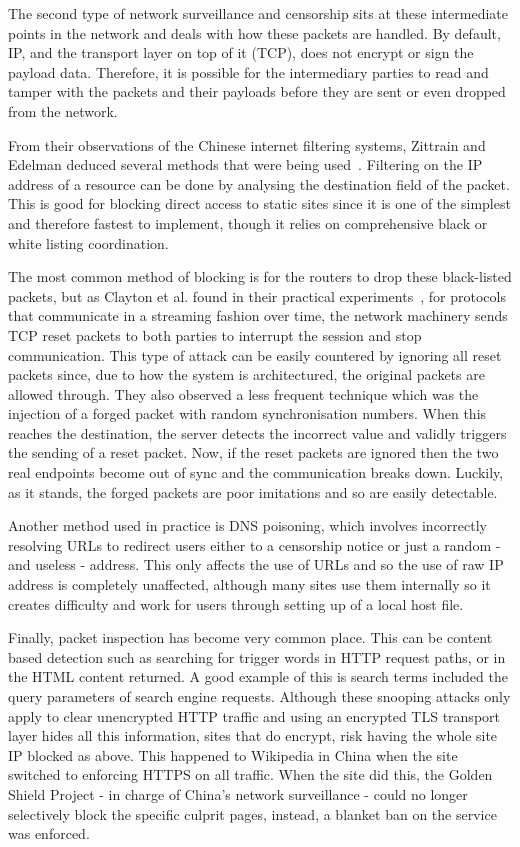 \documentclass[ %
                    author={Samuel Russell},
                supervisor={Prof. Bogdan Warinschi},
                    degree={MEng},
                     title={Innocuous Ciphertexts},
                  subtitle={The DE-CENSOR Scheme},
                      type={research},
                      year={2018} ]{dissertation}
\begin{document}
The second type of network surveillance and censorship sits at these intermediate points in the network and deals with how these packets are handled. By default, IP, and the transport layer on top of it (TCP), does not encrypt or sign the payload data. Therefore, it is possible for the intermediary parties to read and tamper with the packets and their payloads before they are sent or even dropped from the network. 

From their observations of the Chinese internet filtering systems, Zittrain and Edelman deduced several methods that were being used~\cite{edelman2005empirical}.
Filtering on the IP address of a resource can be done by analysing the destination field of the packet. This is good for blocking direct access to static sites since it  is one of the simplest and therefore fastest to implement, though it relies on comprehensive black or white listing coordination.

The most common method of blocking is for the routers to drop these black-listed packets, but as Clayton et al. found in their practical experiments~\cite{clayton2006ignoring}, for protocols that communicate in a streaming fashion over time, the network machinery sends TCP reset packets to both parties to interrupt the session and stop communication. This type of attack can be easily countered by ignoring all reset packets since, due to how the system is architectured, the original packets are allowed through. They also observed a less frequent technique which was the injection of a forged packet with random synchronisation numbers. When this reaches the destination, the server detects the incorrect value and validly triggers the sending of a reset packet. Now, if the reset packets are ignored then the two real endpoints become out of sync and the communication breaks down. Luckily, as it stands, the forged packets are poor imitations and so are easily detectable.

Another method used in practice is DNS poisoning, which involves incorrectly resolving URLs to redirect users either to a censorship notice or just a random - and useless - address. This only affects the use of URLs and so the use of raw IP address is completely unaffected, although many sites use them internally so it creates difficulty and work for users through setting up of a local host file.

Finally, packet inspection has become very common place. This can be content based detection such as searching for trigger words in HTTP request paths, or in the HTML content returned. A good example of this is search terms included the query parameters of  search engine requests. Although these snooping attacks only apply to clear unencrypted HTTP traffic and using an encrypted  TLS transport layer hides all this information, sites that do encrypt, risk having the whole site IP blocked as above. This happened to Wikipedia in China when the site switched to enforcing HTTPS on all traffic. When the site did this, the Golden Shield Project - in charge of China's network surveillance - could no longer selectively block the specific culprit pages, instead, a blanket ban on the service was enforced.
\end{document}
